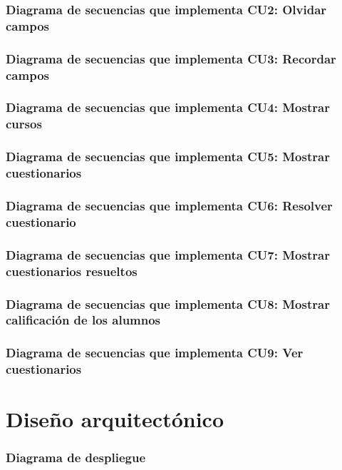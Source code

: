 
\subsubsection{Diagrama de secuencias que implementa CU2: Olvidar campos}

\subsubsection{Diagrama de secuencias que implementa CU3: Recordar campos}

\subsubsection{Diagrama de secuencias que implementa CU4: Mostrar cursos}

\subsubsection{Diagrama de secuencias que implementa CU5: Mostrar cuestionarios}

\subsubsection{Diagrama de secuencias que implementa CU6: Resolver cuestionario}

\subsubsection{Diagrama de secuencias que implementa CU7: Mostrar cuestionarios resueltos}

\subsubsection{Diagrama de secuencias que implementa CU8: Mostrar calificación de los alumnos}

\subsubsection{Diagrama de secuencias que implementa CU9: Ver cuestionarios}

\section{Diseño arquitectónico}

\subsubsection{Diagrama de despliegue}



